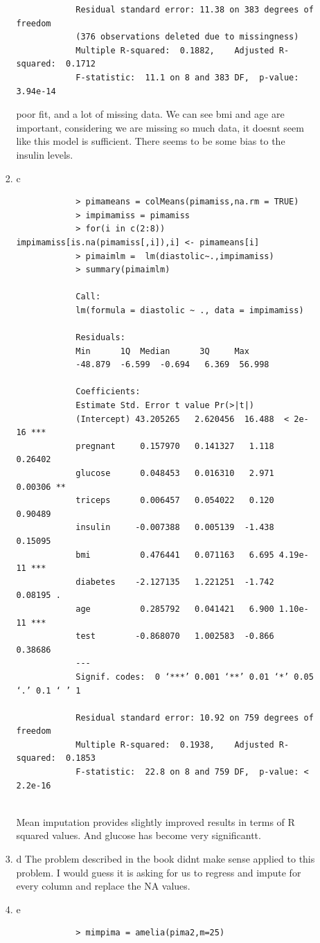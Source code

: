 \documentclass[11pt]{article}
\begin{document}
\begin{enumerate}
\begin{enumerate}
\begin{enumerate}
\begin{verbatim}
			Residual standard error: 11.38 on 383 degrees of freedom
			(376 observations deleted due to missingness)
			Multiple R-squared:  0.1882,	Adjusted R-squared:  0.1712 
			F-statistic:  11.1 on 8 and 383 DF,  p-value: 3.94e-14
		\end{verbatim}
		poor fit, and a lot of missing data. We can see bmi and age are important, considering we are missing so much data, it doesnt seem like this model is sufficient. There seems to be some bias to the insulin levels.
		\item c
		\begin{verbatim}
			> pimameans = colMeans(pimamiss,na.rm = TRUE)
			> impimamiss = pimamiss
			> for(i in c(2:8)) impimamiss[is.na(pimamiss[,i]),i] <- pimameans[i]
			> pimaimlm =  lm(diastolic~.,impimamiss)
			> summary(pimaimlm)
			
			Call:
			lm(formula = diastolic ~ ., data = impimamiss)
			
			Residuals:
			Min      1Q  Median      3Q     Max 
			-48.879  -6.599  -0.694   6.369  56.998 
			
			Coefficients:
			Estimate Std. Error t value Pr(>|t|)    
			(Intercept) 43.205265   2.620456  16.488  < 2e-16 ***
			pregnant     0.157970   0.141327   1.118  0.26402    
			glucose      0.048453   0.016310   2.971  0.00306 ** 
			triceps      0.006457   0.054022   0.120  0.90489    
			insulin     -0.007388   0.005139  -1.438  0.15095    
			bmi          0.476441   0.071163   6.695 4.19e-11 ***
			diabetes    -2.127135   1.221251  -1.742  0.08195 .  
			age          0.285792   0.041421   6.900 1.10e-11 ***
			test        -0.868070   1.002583  -0.866  0.38686    
			---
			Signif. codes:  0 ‘***’ 0.001 ‘**’ 0.01 ‘*’ 0.05 ‘.’ 0.1 ‘ ’ 1
			
			Residual standard error: 10.92 on 759 degrees of freedom
			Multiple R-squared:  0.1938,	Adjusted R-squared:  0.1853 
			F-statistic:  22.8 on 8 and 759 DF,  p-value: < 2.2e-16
			
		\end{verbatim}
		Mean imputation provides slightly improved results in terms of R squared values. And  glucose has become very significantt. 
		\item d
		The problem described in the book didnt make sense applied to this problem. I would guess it is asking for us to regress and impute for every column and replace the NA values.
		\item e
		\begin{verbatim}
			> mimpima = amelia(pima2,m=25)
		

\end{verbatim}
\end{enumerate}
\end{enumerate}
\end{enumerate}
\end{document}
